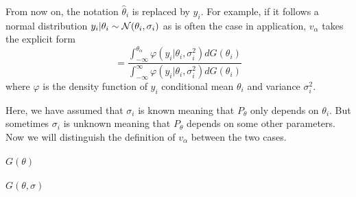 \documentclass[12pt]{article}
\begin{document}
From now on, the notation $\hat{\theta}_i$ is replaced by $y_i$. For example,
if it follows a normal distribution $y_i|\theta_i \sim
    \mathcal{N}(\theta_i,\sigma_i)$ as is often the case in application, $v_\alpha$ takes
the explicit form
\begin{equation*}
    = \frac{{\int_{-\infty}^{\theta_{\alpha}}\varphi(y_i|\theta_i, \sigma_i^2) dG(\theta_i)}}
    {{\int_{-\infty}^{\infty} \varphi(y_i|\theta_i, \sigma_i^2) dG(\theta_i)}}
\end{equation*} where $\varphi$ is the density function of $y_i$ conditional mean $\theta_i$ and variance $\sigma_i^2$.

Here, we have assumed that $\sigma_i$ is known meaning that $P_\theta$ only
depends on $\theta_i$. But sometimes $\sigma_i$ is unknown meaning that
$P_\theta$ depends on some other parameters. Now we will distinguish the
definition of $v_\alpha$ between the two cases.

\paragraph{$G(\theta)$}

\paragraph{$G(\theta,\sigma)$}


\end{document}
